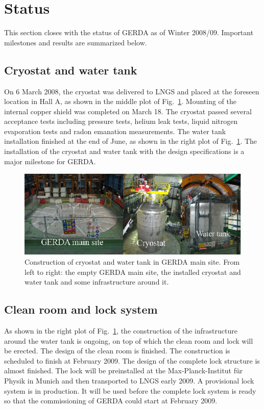 \section{Status}
\label{sec:gerda:stat}
This section closes with the status of GERDA as of Winter 2008/09. Important milestones and results are summarized below.  

\subsection{Cryostat and water tank}
\label{sec:gerda:stat1}
On 6 March 2008, the cryostat was delivered to LNGS and placed at the foreseen location in Hall A, as shown in the middle plot of Fig.~\ref{fig:cryo}. Mounting of the internal copper shield was completed on March 18. The cryostat passed several acceptance tests including pressure tests, helium leak tests, liquid nitrogen evaporation tests and radon emanation measurements. The water tank installation finished at the end of June, as shown in the right plot of Fig.~\ref{fig:cryo}. The installation of the cryostat and water tank with the design specifications is a major milestone for GERDA.

\begin{figure}[tbhp]
  \centering
  \includegraphics[width=\textwidth]{cryostat}
  \caption{Construction of cryostat and water tank in GERDA main site.     From left to right: the empty GERDA main site, the installed     cryostat and water tank and some infrastructure around it.}
  \label{fig:cryo}
\end{figure}

\subsection{Clean room and lock system}
\label{sec:gerda:stat2}
As shown in the right plot of Fig.~\ref{fig:cryo}, the construction of the infrastructure around the water tank is ongoing, on top of which the clean room and lock will be erected. The design of the clean room is finished. The construction is scheduled to finish at February 2009. The design of the complete lock structure is almost finished. The lock will be preinstalled at the Max-Planck-Institut f\"ur Physik in Munich and then transported to LNGS early 2009. A provisional lock system is in production. It will be used before the complete lock system is ready so that the commissioning of GERDA could start at February 2009.

